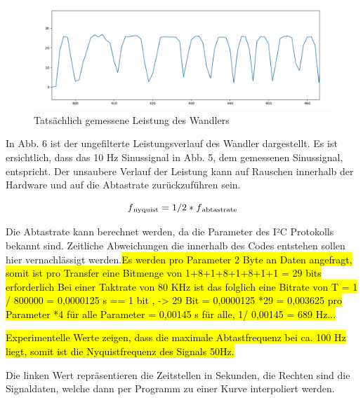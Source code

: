 \begin{figure}
    \centering
    \includegraphics[height= 4cm, width = 12cm]{Pictures/TatsDaten.png}
    \caption{Tatsächlich gemessene Leistung des Wandlers}
\end{figure}

\begin{flushleft}

In Abb. 6 ist der ungefilterte Leistungsverlauf des Wandler dargestellt. Es ist ersichtlich, dass das 10 Hz Sinussignal in Abb. 5, dem gemessenen Sinussignal, entspricht. Der unsaubere Verlauf der Leistung kann auf Rauschen innerhalb der Hardware und auf die Abtastrate zurückzuführen sein. 
\end{flushleft}


\begin{equation}
\label{Sigmoid}
f\textsubscript{nyquist} = 1/2 * f\textsubscript{abtastrate}
\end{equation}

\begin{flushleft}
Die Abtastrate kann berechnet werden, da die Parameter des I²C Protokolls bekannt sind. Zeitliche Abweichungen die innerhalb des Codes entstehen sollen hier vernachlässigt werden.\hl{Es werden pro Parameter 2 Byte an Daten angefragt, somit ist pro Transfer eine Bitmenge von 1+8+1+8+1+8+1+1 = 29 bits erforderlich Bei einer Taktrate von 80 KHz ist das folglich eine Bitrate von T = 1 / 800000 = 0,0000125 s == 1 bit , -> 29 Bit = 0,0000125 *29 = 0,003625 pro Parameter *4 für alle Parameter = 0,00145 s für alle, 1/ 0,00145 = 689 Hz...} 

\hl{Experimentelle Werte zeigen, dass die maximale Abtastfrequenz bei ca. 100 Hz liegt, somit ist die Nyquistfrequenz des Signals 50Hz.}

Die linken Wert repräsentieren die Zeitstellen in Sekunden, die Rechten sind die Signaldaten, welche dann per Programm zu einer Kurve interpoliert werden. 
\end{flushleft}

